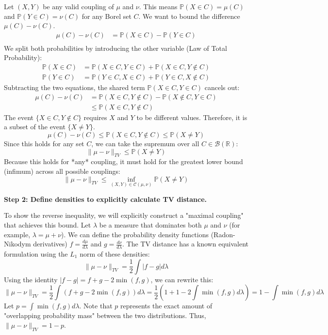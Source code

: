 \begin{solution}
Let $(X, Y)$ be any valid coupling of $\mu$ and $\nu$. This means $\mathbb{P}(X \in C) = \mu(C)$ and $\mathbb{P}(Y \in C) = \nu(C)$ for any Borel set $C$.
We want to bound the difference $\mu(C) - \nu(C)$.
\begin{align*}
\mu(C) - \nu(C) &= \mathbb{P}(X \in C) - \mathbb{P}(Y \in C) \\
\end{align*}
We split both probabilities by introducing the other variable (Law of Total Probability):
\begin{align*}
\mathbb{P}(X \in C) &= \mathbb{P}(X \in C, Y \in C) + \mathbb{P}(X \in C, Y \notin C) \\
\mathbb{P}(Y \in C) &= \mathbb{P}(Y \in C, X \in C) + \mathbb{P}(Y \in C, X \notin C)
\end{align*}
Subtracting the two equations, the shared term $\mathbb{P}(X \in C, Y \in C)$ cancels out:
\begin{align*}
\mu(C) - \nu(C) &= \mathbb{P}(X \in C, Y \notin C) - \mathbb{P}(X \notin C, Y \in C) \\
&\leq \mathbb{P}(X \in C, Y \notin C)
\end{align*}
The event $\{X \in C, Y \notin C\}$ requires $X$ and $Y$ to be different values. Therefore, it is a subset of the event $\{X \neq Y\}$.
\[ \mu(C) - \nu(C) \leq \mathbb{P}(X \in C, Y \notin C) \leq \mathbb{P}(X \neq Y) \]
Since this holds for any set $C$, we can take the supremum over all $C \in \mathcal{B}(\mathbb{R})$:
\[ \|\mu - \nu\|_{TV} \leq \mathbb{P}(X \neq Y) \]
Because this holds for *any* coupling, it must hold for the greatest lower bound (infimum) across all possible couplings:
\[ \|\mu - \nu\|_{TV} \leq \inf_{(X,Y) \in \mathcal{C}(\mu,\nu)} \mathbb{P}(X \neq Y) \]

\textbf{Step 2: Define densities to explicitly calculate TV distance.}

To show the reverse inequality, we will explicitly construct a "maximal coupling" that achieves this bound.
Let $\lambda$ be a measure that dominates both $\mu$ and $\nu$ (for example, $\lambda = \mu + \nu$). We can define the probability density functions (Radon-Nikodym derivatives) $f = \frac{d\mu}{d\lambda}$ and $g = \frac{d\nu}{d\lambda}$.
The TV distance has a known equivalent formulation using the $L_1$ norm of these densities:
\[ \|\mu - \nu\|_{TV} = \frac{1}{2} \int |f - g| d\lambda \]
Using the identity $|f-g| = f + g - 2\min(f,g)$, we can rewrite this:
\[ \|\mu - \nu\|_{TV} = \frac{1}{2} \int (f + g - 2\min(f,g)) d\lambda = \frac{1}{2} \left( 1 + 1 - 2\int \min(f,g) d\lambda \right) = 1 - \int \min(f,g) d\lambda \]
Let $p = \int \min(f,g) d\lambda$. Note that $p$ represents the exact amount of "overlapping probability mass" between the two distributions. Thus, $\|\mu - \nu\|_{TV} = 1 - p$.


\end{solution}
